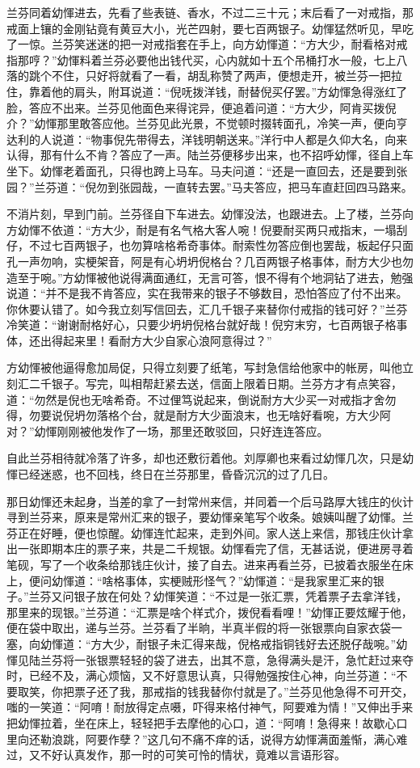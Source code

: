 \documentclass[12pt,UTF8]{ctexbook}
\begin{document}
{{{兰芬同着幼惲进去，先看了些表链、香水，不过二三十元；末后看了一对戒指，那戒面上镶的金刚钻竟有黄豆大小，光芒四射，要七百两银子。幼惲猛然听见，早吃了一惊。兰芬笑迷迷的把一对戒指套在手上，向方幼惲道：“方大少，耐看格对戒指那哼？”幼惲料着兰芬必要他出钱代买，心内就如十五个吊桶打水一般，七上八落的跳个不住，只好将就看了一看，胡乱称赞了两声，便想走开，被兰芬一把拉住，靠着他的肩头，附耳说道：“倪呒拨洋钱，耐替倪买仔罢。”方幼惲急得涨红了脸，答应不出来。兰芬见他面色来得诧异，便追着问道：“方大少，阿肯买拨倪介？”幼惲那里敢答应他。兰芬见此光景，不觉顿时掇转面孔，冷笑一声，便向亨达利的人说道：“物事倪先带得去，洋钱明朝送来。”洋行中人都是久仰大名，向来认得，那有什么不肯？答应了一声。陆兰芬便移步出来，也不招呼幼惲，径自上车坐下。幼惲老着面孔，只得也跨上马车。马夫问道：“还是一直回去，还是要到张园？”兰芬道：“倪勿到张园哉，一直转去罢。”马夫答应，把马车直赶回四马路来。

不消片刻，早到门前。兰芬径自下车进去。幼惲没法，也跟进去。上了楼，兰芬向方幼惲不依道：“方大少，耐是有名气格大客人啘！倪要耐买两只戒指末，一塌刮仔，不过七百两银子，也勿算啥格希奇事体。耐索性勿答应倒也罢哉，板起仔只面孔一声勿响，实梗架音，阿是有心坍坍倪格台？几百两银子格事体，耐方大少也勿造至于啘。”方幼惲被他说得满面通红，无言可答，恨不得有个地洞钻了进去，勉强说道：“并不是我不肯答应，实在我带来的银子不够数目，恐怕答应了付不出来。你休要认错了。如今我立刻写信回去，汇几千银子来替你付戒指的钱可好？”兰芬冷笑道：“谢谢耐格好心，只要少坍坍倪格台就好哉！倪穷末穷，七百两银子格事体，还出得起来里！看耐方大少自家心浪阿意得过？”

方幼惲被他逼得愈加局促，只得立刻要了纸笔，写封急信给他家中的帐房，叫他立刻汇二千银子。写完，叫相帮赶紧去送，信面上限着日期。兰芬方才有点笑容，道：“勿然是倪也无啥希奇。不过俚笃说起来，倒说耐方大少买一对戒指才舍勿得，勿要说倪坍勿落格个台，就是耐方大少面浪末，也无啥好看啘，方大少阿对？”幼惲刚刚被他发作了一场，那里还敢驳回，只好连连答应。

自此兰芬相待就冷落了许多，却也还敷衍着他。刘厚卿也来看过幼惲几次，只是幼惲已经迷惑，也不回栈，终日在兰芬那里，昏昏沉沉的过了几日。

那日幼惲还未起身，当差的拿了一封常州来信，并同着一个后马路厚大钱庄的伙计寻到兰芬来，原来是常州汇来的银子，要幼惲亲笔写个收条。娘姨叫醒了幼惲。兰芬正在好睡，便也惊醒。幼惲连忙起来，走到外间。家人送上来信，那钱庄伙计拿出一张即期本庄的票子来，共是二千规银。幼惲看完了信，无甚话说，便进房寻着笔砚，写了一个收条给那钱庄伙计，接了自去。进来再看兰芬，已披着衣服坐在床上，便问幼惲道：“啥格事体，实梗贼形怪气？”幼惲道：“是我家里汇来的银子。”兰芬又问银子放在何处？幼惲笑道：“不过是一张汇票，凭着票子去拿洋钱，那里来的现银。”兰芬道：“汇票是啥个样式介，拨倪看看哩！”幼惲正要炫耀于他，便在袋中取出，递与兰芬。兰芬看了半晌，半真半假的将一张银票向自家衣袋一塞，向幼惲道：“方大少，耐银子未汇得来哉，倪格戒指铜钱好去还脱仔哉啘。”幼惲见陆兰芬将一张银票轻轻的袋了进去，出其不意，急得满头是汗，急忙赶过来夺时，已经不及，满心烦恼，又不好意思认真，只得勉强按住心神，向兰芬道：“不要取笑，你把票子还了我，那戒指的钱我替你付就是了。”兰芬见他急得不可开交，嗤的一笑道：“阿唷！耐放得定点嗫，吓得来格付神气，阿要难为情！”又伸出手来把幼惲拉着，坐在床上，轻轻把手去摩他的心口，道：“阿唷！急得来！故歇心口里向还勒浪跳，阿要作孽？”这几句不痛不痒的话，说得方幼惲满面羞惭，满心难过，又不好认真发作，那一时的可笑可怜的情状，竟难以言语形容。

}}}
\end{document}
